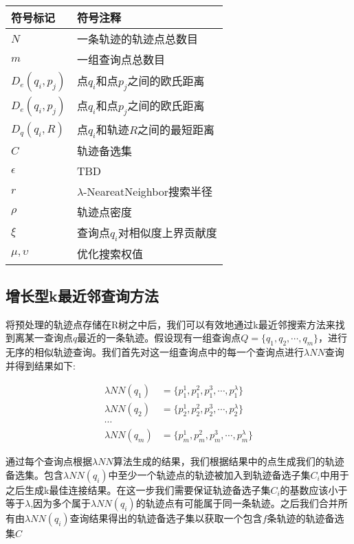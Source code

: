 \begin{table}[!htpb]

  	\centering
		\begin{tabular}{ |p{3cm}||p{9cm}|  }
		\hline
		符号标记 & 符号注释 \\
		\hline
		$N$ & 一条轨迹的轨迹点总数目 \\
		\hline
		$m$ & 一组查询点总数目 \\
		\hline
		$D_{e}(q_{i},p_{j})$ & 点$q_{i}$和点$p_{j}$之间的欧氏距离 \\
		\hline
		$D_{e}(q_{i},p_{j})$ & 点$q_{i}$和点$p_{j}$之间的欧氏距离 \\
		\hline
		$D_{q}(q_{i},R)$ & 点$q_{i}$和轨迹$R$之间的最短距离 \\
		\hline
		$C$ & 轨迹备选集 \\
		\hline
		$\epsilon$ & TBD\\
		\hline
		$r$ & $\lambda$-NeareatNeighbor搜索半径\\
		\hline
		$\rho$ & 轨迹点密度\\
		\hline
		$\xi$ & 查询点$q_{i}$对相似度上界贡献度\\
		\hline
		$\mu,\upsilon$ & 优化搜索权值\\
		\hline
		\end{tabular}
\end{table}

\subsection{增长型k最近邻查询方法}
\label{subsec:iknn}
将预处理的轨迹点存储在R树之中后，我们可以有效地通过k最近邻搜索方法来找到离某一查询点$q$最近的一条轨迹。假设现有一组查询点$Q = \{q_{1},q_{2},\cdots, q_{m}\}$，进行无序的相似轨迹查询。我们首先对这一组查询点中的每一个查询点进行$\lambda NN$查询并得到结果如下:

\begin{align*}
\lambda NN(q_{1}) &= \{p_{1}^{1}, p_{1}^{2}, p_{1}^{3}, \cdots, p_{1}^{\lambda}\}\\ 
\lambda NN(q_{2}) &= \{p_{2}^{1}, p_{2}^{2}, p_{2}^{3}, \cdots, p_{2}^{\lambda}\}\\ 
\cdots\\
\lambda NN(q_{m}) &= \{p_{m}^{1}, p_{m}^{2}, p_{m}^{3}, \cdots, p_{m}^{\lambda}\}
\end{align*}

通过每个查询点根据$\lambda NN$算法生成的结果，我们根据结果中的点生成我们的轨迹备选集。包含$\lambda NN(q_{i})$中至少一个轨迹点的轨迹被加入到轨迹备选子集$C_{i}$中用于之后生成k最佳连接结果。在这一步我们需要保证轨迹备选子集$C_{i}$的基数应该小于等于$\lambda$,因为多个属于$\lambda NN(q_{i})$的轨迹点有可能属于同一条轨迹。之后我们合并所有由$\lambda NN(q_{i})$查询结果得出的轨迹备选子集以获取一个包含$f$条轨迹的轨迹备选集$C$

